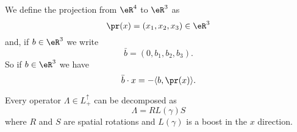 We define the projection from \( \eR^4\) to \( \eR^3\) as
\begin{equation}
    \pr(x)=(x_1,x_2,x_3)\in \eR^3
\end{equation}
and, if \( b\in \eR^3\) we write
\begin{equation}
    \bar b=(0,b_1,b_2,b_3).
\end{equation}
So if \( b\in \eR^3\) we have
\begin{equation}        \label{EQooOIBWooAvxfYz}
    \bar b\cdot x=-\langle b, \pr(x)\rangle .
\end{equation}


\begin{proposition}
    Every operator \( \Lambda\in L^{\uparrow}_+\) can be decomposed as
    \begin{equation}
        \Lambda=RL(\gamma)S
    \end{equation}
    where \( R\) and \( S\) are spatial rotations and \( L(\gamma)\) is a boost in the \( x\) direction.
\end{proposition}

